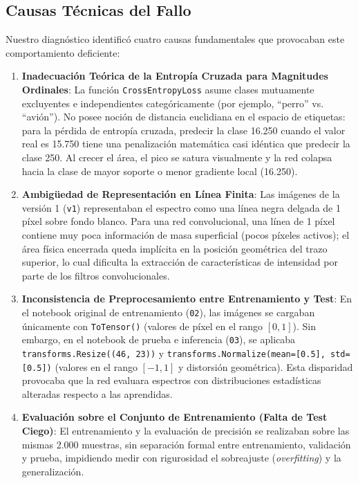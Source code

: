 \documentclass[11pt,a4paper]{article}
\begin{document}
\subsection{Causas Técnicas del Fallo}
Nuestro diagnóstico identificó cuatro causas fundamentales que provocaban este comportamiento deficiente:
\begin{enumerate}
    \item \textbf{Inadecuación Teórica de la Entropía Cruzada para Magnitudes Ordinales}: La función \texttt{CrossEntropyLoss} asume clases mutuamente excluyentes e independientes categóricamente (por ejemplo, ``perro'' vs. ``avión''). No posee noción de distancia euclidiana en el espacio de etiquetas: para la pérdida de entropía cruzada, predecir la clase 16.250 cuando el valor real es 15.750 tiene una penalización matemática casi idéntica que predecir la clase 250. Al crecer el área, el pico se satura visualmente y la red colapsa hacia la clase de mayor soporte o menor gradiente local (16.250).
    \item \textbf{Ambigüedad de Representación en Línea Finita}: Las imágenes de la versión 1 (\texttt{v1}) representaban el espectro como una línea negra delgada de 1 píxel sobre fondo blanco. Para una red convolucional, una línea de 1 píxel contiene muy poca información de masa superficial (pocos píxeles activos); el área física encerrada queda implícita en la posición geométrica del trazo superior, lo cual dificulta la extracción de características de intensidad por parte de los filtros convolucionales.
    \item \textbf{Inconsistencia de Preprocesamiento entre Entrenamiento y Test}: En el notebook original de entrenamiento (\texttt{02}), las imágenes se cargaban únicamente con \texttt{ToTensor()} (valores de píxel en el rango $[0, 1]$). Sin embargo, en el notebook de prueba e inferencia (\texttt{03}), se aplicaba \texttt{transforms.Resize((46, 23))} y \texttt{transforms.Normalize(mean=[0.5], std=[0.5])} (valores en el rango $[-1, 1]$ y distorsión geométrica). Esta disparidad provocaba que la red evaluara espectros con distribuciones estadísticas alteradas respecto a las aprendidas.
    \item \textbf{Evaluación sobre el Conjunto de Entrenamiento (Falta de Test Ciego)}: El entrenamiento y la evaluación de precisión se realizaban sobre las mismas 2.000 muestras, sin separación formal entre entrenamiento, validación y prueba, impidiendo medir con rigurosidad el sobreajuste (\textit{overfitting}) y la generalización.
\end{enumerate}
\end{document}
